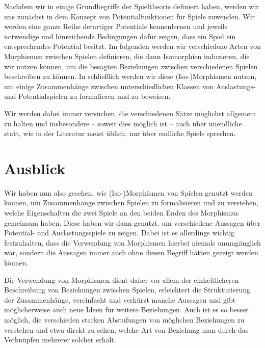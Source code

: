 \documentclass[a4paper,ngerman,11pt,bibliography=totoc]{scrartcl}
\theoremstyle{definition}
\theoremstyle{plain}
\theoremstyle{remark}
\begin{document}
Nachdem wir in  einige Grundbegriffe der Spieltheorie definiert haben, werden wir uns zunächst in  dem Konzept von Potentialfunktionen für Spiele zuwenden. Wir werden eine ganze Reihe derartiger Potentiale kennenlernen und jeweils notwendige und hinreichende Bedingungen dafür zeigen, dass ein Spiel ein entsprechendes Potential besitzt. Im folgenden  werden wir verschiedene Arten von Morphismen zwischen Spielen definieren, die dann Isomorphien induzieren, die wir nutzen können, um die besagten Beziehungen zwischen verschiedenen Spielen beschreiben zu können. In  schließlich werden wir diese (Iso-)Morphismen nutzen, um einige Zusammenhänge zwischen unterschiedlichen Klassen von Auslastungs- und Potentialspielen zu formulieren und zu beweisen.

Wir werden dabei immer versuchen, die verschiedenen Sätze möglichst allgemein zu halten und insbesondere -- soweit dies möglich ist -- auch über unendliche statt, wie in der Literatur meist üblich, nur über endliche Spiele sprechen.






{}
\section*{Ausblick}

Wir haben nun also gesehen, wie (Iso-)Morphismen von Spielen genutzt werden können, um Zusammenhänge zwischen Spielen zu formalisieren und zu verstehen, welche Eigenschaften die zwei Spiele an den beiden Enden des Morphismus gemeinsam haben. Diese haben wir dann genutzt, um verschiedene Aussagen über Potential- und Auslastungsspiele zu zeigen. Dabei ist es allerdings wichtig festzuhalten, dass die Verwendung von Morphismen hierbei niemals unumgänglich war, sondern die Aussagen immer auch ohne diesen Begriff hätten gezeigt werden können. 

Die Verwendung von Morphismen dient daher vor allem der einheitlicheren Beschreibung von Beziehungen zwischen Spielen, erleichtert die Strukturierung der Zusammenhänge, vereinfacht und verkürzt manche Aussagen und gibt möglicherweise auch neue Ideen für weitere Beziehungen. Auch ist es so besser möglich, die verschieden starken Abstufungen von möglichen Beziehungen zu verstehen und etwa direkt zu sehen, welche Art von Beziehung man durch das Verknüpfen mehrerer solcher erhält.
\end{document}
